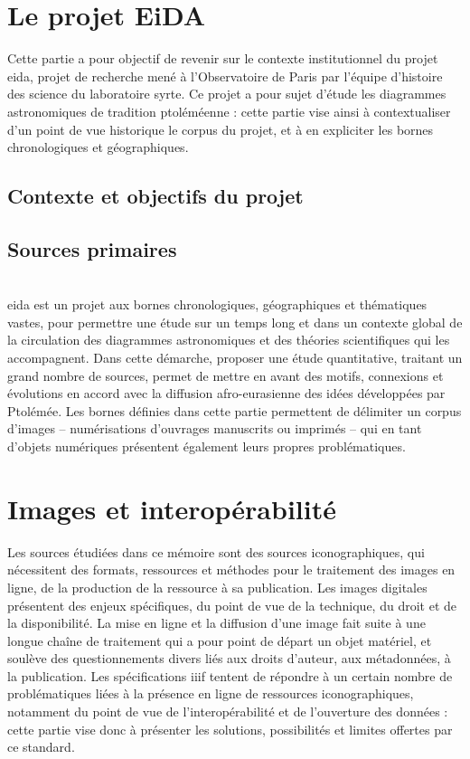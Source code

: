 \documentclass[a4paper,12pt,twoside]{book}
\newcommand{\eida}{\gls{eida}\xspace}
\newcommand{\iiif}{\gls{iiif}\xspace}
\newcommand{\clearemptydoublepage}{\newpage{\pagestyle{empty}\cleardoublepage}}
\begin{document}
        \chapter{Le projet EiDA}
        Cette partie a pour objectif de revenir sur le contexte institutionnel du projet \eida, projet de recherche mené à l'Observatoire de Paris par l'équipe d'histoire des science du laboratoire \acrshort{syrte}. Ce projet a pour sujet d'étude les diagrammes astronomiques de tradition ptoléméenne : cette partie vise ainsi à contextualiser d'un point de vue historique le corpus du projet, et à en expliciter les bornes chronologiques et géographiques.
        
	        \section{Contexte et objectifs du projet}
	            
	
	        \section{Sources primaires}
	            
			\\
		
		\eida est un projet aux bornes chronologiques, géographiques et thématiques vastes, pour permettre une étude sur un temps long et dans un contexte global de la circulation des diagrammes astronomiques et des théories scientifiques qui les accompagnent. Dans cette démarche, proposer une étude quantitative, traitant un grand nombre de sources, permet de mettre en avant des motifs, connexions et évolutions en accord avec la diffusion afro-eurasienne des idées développées par Ptolémée. Les bornes définies dans cette partie permettent de délimiter un corpus d'images -- numérisations d'ouvrages manuscrits ou imprimés -- qui en tant d'objets numériques présentent également leurs propres problématiques.
        \clearemptydoublepage
        
        \chapter{Images et interopérabilité}
        Les sources étudiées dans ce mémoire sont des sources iconographiques, qui nécessitent des formats, ressources et méthodes pour le traitement des images en ligne, de la production de la ressource à sa publication. Les images digitales présentent des enjeux spécifiques, du point de vue de la technique, du droit et de la disponibilité. La mise en ligne et la diffusion d'une image fait suite à une longue chaîne de traitement qui a pour point de départ un objet matériel, et soulève des questionnements divers liés aux droits d'auteur, aux métadonnées, à la publication. Les spécifications \iiif tentent de répondre à un certain nombre de problématiques liées à la présence en ligne de ressources iconographiques, notamment du point de vue de l'interopérabilité et de l'ouverture des données : cette partie vise donc à présenter les solutions, possibilités et limites offertes par ce standard.
        
\end{document}
